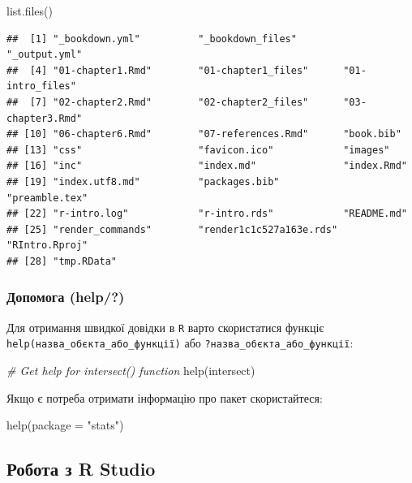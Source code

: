 \documentclass[
]{book}
\newenvironment{Shaded}{\begin{snugshade}}{\end{snugshade}}
\newcommand{\AttributeTok}[1]{\textcolor[rgb]{0.77,0.63,0.00}{#1}}
\newcommand{\CommentTok}[1]{\textcolor[rgb]{0.56,0.35,0.01}{\textit{#1}}}
\newcommand{\FunctionTok}[1]{\textcolor[rgb]{0.00,0.00,0.00}{#1}}
\newcommand{\NormalTok}[1]{#1}
\newcommand{\StringTok}[1]{\textcolor[rgb]{0.31,0.60,0.02}{#1}}
\begin{document}
\begin{Shaded}
\begin{Highlighting}[]
\FunctionTok{list.files}\NormalTok{()}
\end{Highlighting}
\end{Shaded}

\begin{verbatim}
##  [1] "_bookdown.yml"          "_bookdown_files"        "_output.yml"           
##  [4] "01-chapter1.Rmd"        "01-chapter1_files"      "01-intro_files"        
##  [7] "02-chapter2.Rmd"        "02-chapter2_files"      "03-chapter3.Rmd"       
## [10] "06-chapter6.Rmd"        "07-references.Rmd"      "book.bib"              
## [13] "css"                    "favicon.ico"            "images"                
## [16] "inc"                    "index.md"               "index.Rmd"             
## [19] "index.utf8.md"          "packages.bib"           "preamble.tex"          
## [22] "r-intro.log"            "r-intro.rds"            "README.md"             
## [25] "render_commands"        "render1c1c527a163e.rds" "RIntro.Rproj"          
## [28] "tmp.RData"
\end{verbatim}

\hypertarget{chapter1315}{%
\subsubsection{Допомога (help/?)}\label{chapter1315}}

Для отримання швидкої довідки в \texttt{R} варто скористатися функціє \texttt{help(назва\_об\textquotesingle{}єкта\_або\_функції)} або \texttt{?назва\_об\textquotesingle{}єкта\_або\_функції}:

\begin{Shaded}
\begin{Highlighting}[]
\CommentTok{\# Get help for intersect() function}
\FunctionTok{help}\NormalTok{(intersect)}
\end{Highlighting}
\end{Shaded}

Якщо є потреба отримати інформацію про пакет скористайтеся:

\begin{Shaded}
\begin{Highlighting}[]
\FunctionTok{help}\NormalTok{(}\AttributeTok{package =} \StringTok{"stats"}\NormalTok{)}
\end{Highlighting}
\end{Shaded}

\hypertarget{chapter132}{%
\subsection{Робота з R Studio}\label{chapter132}}
\end{document}
